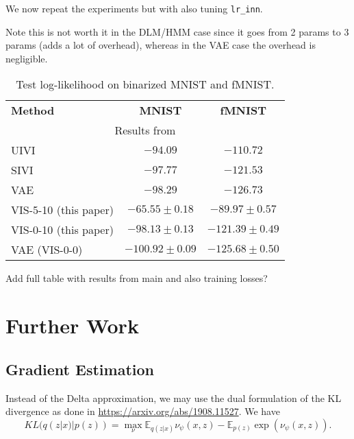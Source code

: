 We now repeat the experiments but with also tuning \texttt{lr\_inn}.

Note this is not worth it in the DLM/HMM case since it goes from 2 params to 3 params (adds a lot of overhead), whereas in the VAE case the overhead is negligible.



\begin{table}[!ht]
\centering
\caption{Test log-likelihood on binarized MNIST and fMNIST.}\label{tbl:iwhvae}
\begin{tabular}{lcc}
\cline{1-3}
\textbf{Method}   & \textbf{MNIST}                             & \textbf{fMNIST}   \\ \cline{1-3}
\multicolumn{3}{c}{\small Results from \cite{pmlr-v89-titsias19a}}       \\
    UIVI          & $-94.09$ &  $-110.72$ \\
    SIVI          & $-97.77$ &  $-121.53$ \\
    VAE          & $-98.29$ &  $-126.73$ \\
    \cline{1-3}
    VIS-5-10 (this paper)     & $\bm{-65.55 \pm 0.18}$ & $\bm{-89.97 \pm 0.57}$  \\
    VIS-0-10 (this paper)     & $-98.13 \pm 0.13$ & $-121.39 \pm 0.49$  \\
    VAE (VIS-0-0)              & $-100.92 \pm 0.09$ & $-125.68 \pm 0.50$ \\
\end{tabular}
\end{table}

Add full table with results from main and also training losses?
\fi

\iffalse
\section{Further Work}

\subsection{Gradient Estimation}

Instead of the Delta approximation, we may use the dual formulation of the KL divergence as done in \url{https://arxiv.org/abs/1908.11527}. We have 
$$
KL(q(z|x) | p(z)) = \max_{\nu} \mathbb{E}_{q(z|x)} \nu_{\psi}(x,z) -  \mathbb{E}_{p(z)} \exp (\nu_{\psi}(x,z)).
$$


